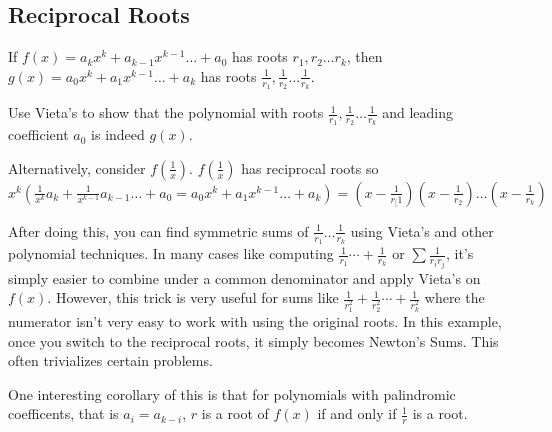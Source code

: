 \documentclass[mast]{lucky}
\begin{document}
\pagebreak


\subsection{Reciprocal Roots}
\begin{theo}
If $f(x)=a_{k}x^{k}+a_{k-1}x^{k-1}\ldots + a_{0}$ has roots $r_{1},r_{2}\ldots r_{k}$, then $g(x)=a_{0}x^{k}+a_{1}x^{k-1}\ldots + a_{k}$ has roots $\frac{1}{r_{1}}, \frac{1}{r_{2}}\ldots \frac{1}{r_{k}}$.
\end{theo}

\begin{pro}
Use Vieta\rq{}s  to show that the polynomial with roots $\frac{1}{r_{1}}, \frac{1}{r_{2}}\ldots \frac{1}{r_{k}}$ and leading coefficient $a_{0}$ is indeed $g(x)$.
\end{pro}

\begin{pro}
Alternatively, consider $f(\frac{1}{x})$. $f(\frac{1}{x})$ has reciprocal roots so $x^{k}(\frac{1}{x^{k}}a_{k}+\frac{1}{x^{k-1}}a_{k-1}\ldots + a_{0}=a_{0}x^{k}+a_{1}x^{k-1}\ldots + a_{k})=(x-\frac{1}{r_[1})(x-\frac{1}{r_{2}})\ldots (x-\frac{1}{r_{k}})$
\end{pro}
After doing this, you can find symmetric sums of $\frac{1}{r_{1}} \ldots \frac{1}{r_{k}}$ using Vieta\rq{}s and other polynomial techniques. In many cases like computing $\frac{1}{r_{1}}\cdots + \frac{1}{r_{k}}$ or $\sum \frac{1}{r_{i}r_{j}}$, it\rq{}s simply easier to combine under a common denominator and apply Vieta\rq{}s on $f(x)$. However, this trick is very useful for sums like $\frac{1}{r_{1}^2}+\frac{1}{r_{2}^2}\cdots  + \frac{1}{r_{k}^2}$ where the numerator isn\rq{}t very easy to work with using the original roots. In this example, once you switch to the reciprocal roots, it simply becomes Newton\rq{}s Sums. This often trivializes certain problems.

One interesting corollary of this is that for polynomials with palindromic coefficents, that is $a_{i}=a_{k-i}$, $r$ is a root of $f(x)$ if and only if $\frac{1}{r}$ is a root.
\end{document}

